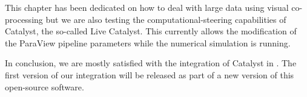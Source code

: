 
This chapter has been dedicated on how to deal with large data using visual
co-processing but we are also testing the computational-steering capabilities of
Catalyst, the so-called Live Catalyst. This currently allows the modification of
the ParaView pipeline parameters while the numerical simulation is running.

In conclusion, we are mostly satisfied with the integration of Catalyst in
\CS. The first version of our integration will be released as part of a
new version of this open-source software.



